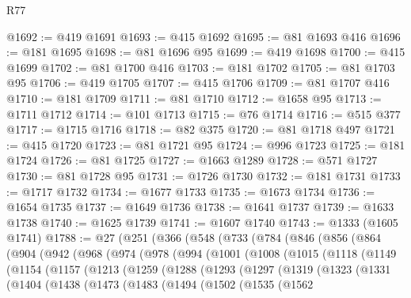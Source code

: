 \begin{lexlean}{R77}
\begin{coremodule}
@1692 := @419 @1691
@1693 := @415 @1692
@1695 := @81 @1693 @416
@1696 := @181 @1695
@1698 := @81 @1696 @95
@1699 := @419 @1698
@1700 := @415 @1699
@1702 := @81 @1700 @416
@1703 := @181 @1702
@1705 := @81 @1703 @95
@1706 := @419 @1705
@1707 := @415 @1706
@1709 := @81 @1707 @416
@1710 := @181 @1709
@1711 := @81 @1710
@1712 := @1658 @95
@1713 := @1711 @1712
@1714 := @101 @1713
@1715 := @76 @1714
@1716 := @515 @377
@1717 := @1715 @1716
@1718 := @82 @375
@1720 := @81 @1718 @497
@1721 := @415 @1720
@1723 := @81 @1721 @95
@1724 := @996 @1723
@1725 := @181 @1724
@1726 := @81 @1725
@1727 := @1663 @1289
@1728 := @571 @1727
@1730 := @81 @1728 @95
@1731 := @1726 @1730
@1732 := @181 @1731
@1733 := @1717 @1732
@1734 := @1677 @1733
@1735 := @1673 @1734
@1736 := @1654 @1735
@1737 := @1649 @1736
@1738 := @1641 @1737
@1739 := @1633 @1738
@1740 := @1625 @1739
@1741 := @1607 @1740
@1743 := @1333 (@1605 @1741)
@1788 := @27
    (@251
      (@366
        (@548
          (@733
            (@784
              (@846
                (@856
                  (@864
                    (@904
                      (@942
                        (@968
                          (@974
                            (@978
                              (@994
                                (@1001
                                  (@1008
                                    (@1015
                                      (@1118
                                        (@1149
                                          (@1154
                                            (@1157
                                              (@1213
                                                (@1259
                                                  (@1288
                                                    (@1293
                                                      (@1297
                                                        (@1319
                                                          (@1323
                                                            (@1331
                                                              (@1404
                                                                (@1438
                                                                  (@1473
                                                                    (@1483
                                                                      (@1494
                                                                        (@1502
                                                                          (@1535
                                                                            (@1562

\end{coremodule}
\end{lexlean}
